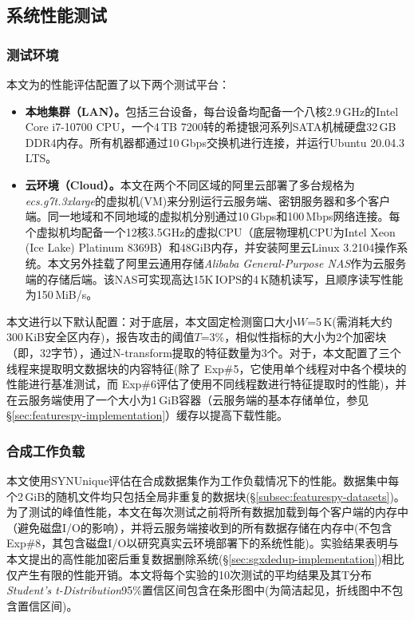 \subsection{系统性能测试}
\label{subsec:featurespy-evaluation-performance}

\subsubsection{测试环境}
\label{subsubsec:featurespy-platform}

本文为\prototype 的性能评估配置了以下两个测试平台：

\begin{itemize}[leftmargin=*]
    \item {\bf 本地集群（LAN）。}包括三台设备，每台设备均配备一个八核2.9\,GHz的Intel Core i7-10700 CPU，一个4\,TB 7200转的希捷银河系列SATA机械硬盘32\,GB DDR4内存。所有机器都通过10\,Gbps交换机进行连接，并运行Ubuntu 20.04.3 LTS。
    \item {\bf 云环境（Cloud）。}本文在两个不同区域的阿里云\cite{Alibaba}部署了多台规格为{\em ecs.g7t.3xlarge}的虚拟机(VM)来分别运行云服务端、密钥服务器和多个客户端。同一地域和不同地域的虚拟机分别通过10\,Gbps和100\,Mbps网络连接。每个虚拟机均配备一个12核3.5GHz的虚拟CPU（底层物理机CPU为Intel Xeon (Ice Lake) Platinum 8369B）和48GiB内存，并安装阿里云Linux 3.2104操作系统。本文另外挂载了阿里云通用存储{\em Alibaba General-Purpose NAS}作为云服务端的存储后端。该NAS可实现高达15K\,IOPS的4\,K随机读写，且顺序读写性能为150\,MiB/s。
\end{itemize}

本文进行以下默认配置：对于底层\sysnameF，本文固定检测窗口大小$W$=5\,K(需消耗大约300\,KiB安全区内存)，报告攻击的阈值$T$=3\%，相似性指标的大小为2个加密块（即，32字节），通过N-transform提取的特征数量为3个。对于\prototype，本文配置了三个线程来提取明文数据块的内容特征(除了 Exp\#5，它使用单个线程对\prototype 中各个模块的性能进行基准测试，而 Exp\#6评估了\prototype 使用不同线程数进行特征提取时的性能)，并在云服务端使用了一个大小为1\,GiB容器（云服务端的基本存储单位，参见\S\ref{sec:featurespy-implementation}）缓存以提高下载性能。

\subsubsection{合成工作负载}
\label{subsubsec:featurespy-syn}
本文使用SYNUnique评估\prototype 在合成数据集作为工作负载情况下的性能。数据集中每个2\,GiB的随机文件均只包括全局非重复的数据块(\S\ref{subsec:featurespy-datasets})。为了测试\prototype 的峰值性能，本文在每次测试之前将所有数据加载到每个客户端的内存中（避免磁盘I/O的影响），并将云服务端接收到的所有数据存储在内存中(不包含Exp\#8，其包含磁盘I/O以研究真实云环境部署下的系统性能)。实验结果表明\prototype 与本文提出的高性能加密后重复数据删除系统\sysnameS (\S\ref{sec:sgxdedup-implementation})相比仅产生有限的性能开销。本文将每个实验的10次测试的平均结果及其T分布{\em Student's t-Distribution}95\%置信区间包含在条形图中(为简洁起见，折线图中不包含置信区间)。

